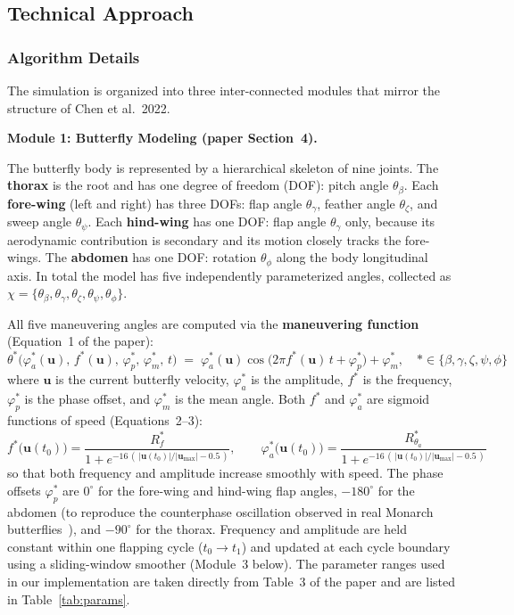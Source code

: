 \documentclass[12pt]{article}
\begin{document}
\subsection{Technical Approach}

\subsubsection{Algorithm Details}

The simulation is organized into three inter-connected modules that mirror
the structure of Chen et al.\ 2022.

\textbf{Module 1: Butterfly Modeling (paper Section~4).}

The butterfly body is represented by a hierarchical skeleton of nine joints.
The \textbf{thorax} is the root and has one degree of freedom (DOF): pitch angle
$\theta_\beta$. Each \textbf{fore-wing} (left and right) has three DOFs:
flap angle $\theta_\gamma$, feather angle $\theta_\zeta$, and sweep angle
$\theta_\psi$. Each \textbf{hind-wing} has one DOF: flap angle $\theta_\gamma$
only, because its aerodynamic contribution is secondary and its motion closely
tracks the fore-wings. The \textbf{abdomen} has one DOF: rotation $\theta_\phi$
along the body longitudinal axis. In total the model has five independently
parameterized angles, collected as
$\chi = \{\theta_\beta, \theta_\gamma, \theta_\zeta, \theta_\psi, \theta_\phi\}$.

All five maneuvering angles are computed via the \textbf{maneuvering function}
(Equation~1 of the paper):
\[
  \theta^{*}\!\bigl(\varphi_a^{*}(\mathbf{u}),\,f^{*}(\mathbf{u}),\,
  \varphi_p^{*},\,\varphi_m^{*},\,t\bigr)
  \;=\;
  \varphi_a^{*}(\mathbf{u})\cos\!\bigl(2\pi f^{*}(\mathbf{u})\,t
  + \varphi_p^{*}\bigr) + \varphi_m^{*},
  \quad * \in \{\beta,\gamma,\zeta,\psi,\phi\}
\]
where $\mathbf{u}$ is the current butterfly velocity, $\varphi_a^{*}$ is the
amplitude, $f^{*}$ is the frequency, $\varphi_p^{*}$ is the phase offset, and
$\varphi_m^{*}$ is the mean angle. Both $f^{*}$ and $\varphi_a^{*}$ are
sigmoid functions of speed (Equations~2--3):
\[
  f^{*}\!\bigl(\mathbf{u}(t_0)\bigr)
  = \frac{R_f^{*}}{1 + e^{-16\,(\,|\mathbf{u}(t_0)|/|\mathbf{u}_{\max}| - 0.5\,)}},
  \qquad
  \varphi_a^{*}\!\bigl(\mathbf{u}(t_0)\bigr)
  = \frac{R_{\theta_a}^{*}}{1 + e^{-16\,(\,|\mathbf{u}(t_0)|/|\mathbf{u}_{\max}| - 0.5\,)}}
\]
so that both frequency and amplitude increase smoothly with speed. The phase
offsets $\varphi_p^{*}$ are $0^\circ$ for the fore-wing and hind-wing flap angles,
$-180^\circ$ for the abdomen (to reproduce the counterphase oscillation observed
in real Monarch butterflies~\cite{Sridhar2016}), and $-90^\circ$ for the thorax.
Frequency and amplitude are held constant within one flapping cycle
($t_0 \to t_1$) and updated at each cycle boundary using a sliding-window smoother
(Module~3 below). The parameter ranges used in our implementation are taken
directly from Table~3 of the paper and are listed in Table~\ref{tab:params}.
\end{document}
